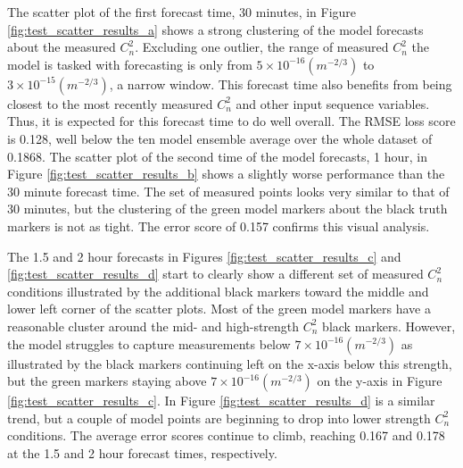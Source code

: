 The scatter plot of the first forecast time, 30 minutes, in Figure \ref{fig:test_scatter_results_a} shows a strong clustering of the model forecasts about the measured $C_{n}^{2}$. Excluding one outlier, the range of measured $C_{n}^{2}$ the model is tasked with forecasting is only from $5 \times 10^{-16} (m^{-2/3})$ to $3 \times 10^{-15} (m^{-2/3})$, a narrow window. This forecast time also benefits from being closest to the most recently measured $C_{n}^{2}$ and other input sequence variables. Thus, it is expected for this forecast time to do well overall. The RMSE loss score is 0.128, well below the ten model ensemble average over the whole dataset of 0.1868. The scatter plot of the second time of the model forecasts, 1 hour, in Figure \ref{fig:test_scatter_results_b} shows a slightly worse performance than the 30 minute forecast time. The set of measured points looks very similar to that of 30 minutes, but the clustering of the green model markers about the black truth markers is not as tight. The error score of 0.157 confirms this visual analysis.

The 1.5 and 2 hour forecasts in Figures \ref{fig:test_scatter_results_c} and \ref{fig:test_scatter_results_d} start to clearly show a different set of measured $C_{n}^{2}$ conditions illustrated by the additional black markers toward the middle and lower left corner of the scatter plots. Most of the green model markers have a reasonable cluster around the mid- and high-strength $C_{n}^{2}$ black markers. However, the model struggles to capture measurements below $7 \times 10^{-16} (m^{-2/3})$ as illustrated by the black markers continuing left on the x-axis below this strength, but the green markers staying above $7 \times 10^{-16} (m^{-2/3})$ on the y-axis in Figure \ref{fig:test_scatter_results_c}. In Figure \ref{fig:test_scatter_results_d} is a similar trend, but a couple of model points are beginning to drop into lower strength $C_{n}^{2}$ conditions. The average error scores continue to climb, reaching 0.167 and 0.178 at the 1.5 and 2 hour forecast times, respectively.

